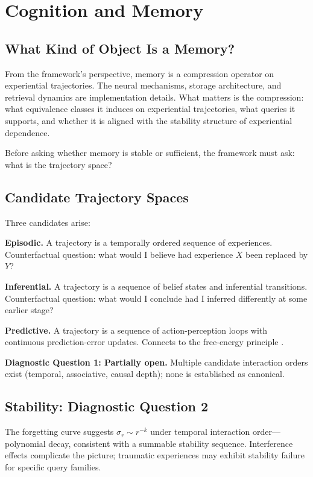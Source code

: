 \chapter{Cognition and Memory}

\section{What Kind of Object Is a Memory?}

From the framework's perspective, memory is a compression operator on experiential trajectories. The neural mechanisms, storage architecture, and retrieval dynamics are implementation details. What matters is the compression: what equivalence classes it induces on experiential trajectories, what queries it supports, and whether it is aligned with the stability structure of experiential dependence.

Before asking whether memory is stable or sufficient, the framework must ask: what is the trajectory space?

\section{Candidate Trajectory Spaces}

Three candidates arise:

\textbf{Episodic.} A trajectory is a temporally ordered sequence of experiences. Counterfactual question: what would I believe had experience $X$ been replaced by $Y$?

\textbf{Inferential.} A trajectory is a sequence of belief states and inferential transitions. Counterfactual question: what would I conclude had I inferred differently at some earlier stage?

\textbf{Predictive.} A trajectory is a sequence of action-perception loops with continuous prediction-error updates. Connects to the free-energy principle \cite{Friston2010}.

\textbf{Diagnostic Question 1: Partially open.} Multiple candidate interaction orders exist (temporal, associative, causal depth); none is established as canonical.

\section{Stability: Diagnostic Question 2}

The forgetting curve \cite{Ebbinghaus1885} suggests $\sigma_r \sim r^{-k}$ under temporal interaction order---polynomial decay, consistent with a summable stability sequence. Interference effects complicate the picture; traumatic experiences may exhibit stability failure for specific query families.

